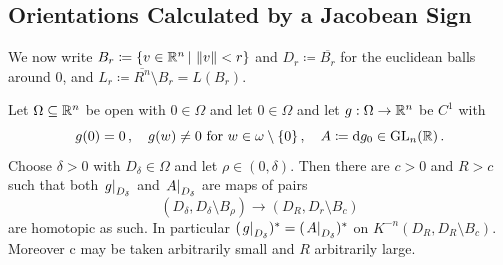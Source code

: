 \subsection{Orientations Calculated by a Jacobean Sign}
We now write $B_r \coloneq \{v\in \mathbb{R}^n\,|\, \left\lVert v\right\rVert<r\}$ and $D_r\coloneq \overline{B_r}$ for the euclidean balls around $0$, and $L_r\coloneq \overline{R^n}\setminus B_r=L(B_r)$.
\begin{lemma}[Linearisation] \label{lem:orient-Linearisation}
Let $\Omega\subseteq \mathbb{R}^n$ be open with $0\in \Omega$ and let $0\in \Omega$ and let $g:\Omega \to \mathbb{R}^n$ be $C^1$ with 
\begin{equation*}
    g(0)=0\,,\quad g(w)\neq 0 \text{ for }w\in \omega\setminus \{0\}\,,\quad A\coloneq \mathop{}\!\mathrm{d} g_0 \in \mathrm{GL}_n(\mathbb{R})\,.
\end{equation*} Choose $\delta>0$ with $D_\delta\in \Omega$ and let $\rho\in(0,\delta)$. Then there are $c>0$ and $R>c$ such that both $\left.g\right|_{D_{\delta}}$ and $\left.A\right|_{D_{\delta}}$ are maps of pairs
\begin{equation*}
    (D_{\delta},D_{\delta}\setminus B_\rho) \to (D_R,D_r\setminus B_c)
\end{equation*} are homotopic as such. In particular $(\left.g\right|_{D_{\delta}})^*=(\left.A\right|_{D_{\delta}})^*$ on $K^{-n}(D_R,D_R\setminus B_c)$. Moreover c may be taken arbitrarily small and $R$ arbitrarily large.
\end{lemma}
